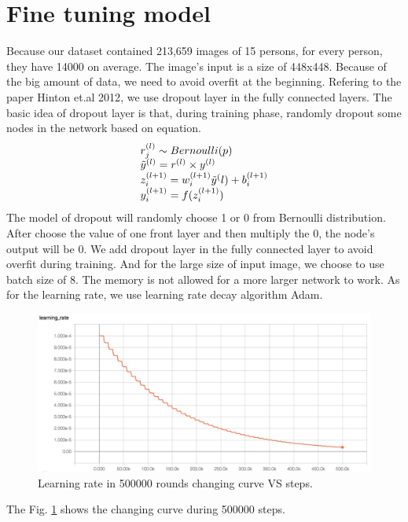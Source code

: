 \documentclass[senior]{IPSstyle}
\begin{document}
\section{Fine tuning model}
Because our dataset contained 213,659 images of 15 persons, for every person, they have 14000 on average.
The image's input is a size of 448x448.
Because of the big amount of data, we need to avoid overfit at the beginning.
Refering to the paper Hinton et.al 2012\cite{DBLP:journals/corr/abs-1207-0580}, we use dropout layer in the fully connected layers.
The basic idea of dropout layer is that, during training phase, randomly dropout some nodes in the network based on equation.
\begin{equation}\label{eq: dropout}
\begin{array}{l}
     r_{j}^{(l)} \sim Bernoulli(p)\\
    \Tilde{y}^{(l)} = r^{(l)} \times y^{(l)} \\
     z_i^{(l+1)} = w_i^{(l+1)}\Tilde{y}^(l) + b_i^{(l+1)}\\
     y_i^{(l+1)} = f(z_i^{(l+1)})
\end{array}
\end{equation}
The model of dropout will randomly choose 1 or 0 from Bernoulli distribution.
After choose the value of one front layer and then multiply the 0, the node's output will be 0.
We add dropout layer in the fully connected layer to avoid overfit during training.
And for the large size of input image, we choose to use batch size of 8.
The memory is not allowed for a more larger network to work.
As for the learning rate, we use learning rate decay algorithm Adam\cite{kingma2014adam}.
\begin{figure}
    \centering
    \includegraphics[width=15cm]{MasterThesis-master/images/learningrate.jpg}
    \caption{Learning rate in 500000 rounds changing curve VS steps.}
    \label{fig:learning rate}
\end{figure}
The Fig. \ref{fig:learning rate} shows the changing curve during 500000 steps.
\end{document}
